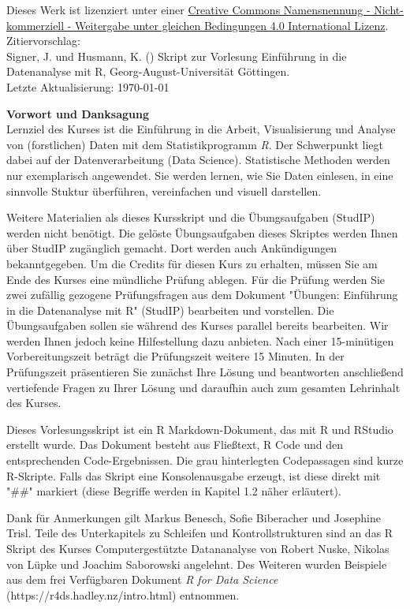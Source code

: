 \begin{titlepage}
\begin{center}
\end{center}
\newpage
\vspace*{\fill}
Dieses Werk ist lizenziert unter einer \href{https://creativecommons.org/licenses/by-nc-sa/4.0/}{Creative Commons Namensnennung - Nicht-kommerziell - Weitergabe unter gleichen Bedingungen 4.0 International Lizenz}. \\[1cm]
Zitiervorschlag: \\
Signer, J. und Husmann, K. (\the\year{}) Skript zur Vorlesung Einführung in die Datenanalyse mit R, Georg-August-Universität Göttingen.
~\\[1cm]
Letzte Aktualisierung: \today

\newpage

{\bf Vorwort und Danksagung} \\[0.5cm]

Lernziel des Kurses ist die Einführung in die Arbeit, Visualisierung und Analyse von (forstlichen) Daten mit dem Statistikprogramm \textit{R}. Der Schwerpunkt liegt dabei auf der Datenverarbeitung (Data Science). Statistische Methoden werden nur exemplarisch angewendet. Sie werden lernen, wie Sie Daten einlesen, in eine sinnvolle Stuktur überführen, vereinfachen und visuell darstellen.

Weitere Materialien als dieses Kursskript und die Übungsaufgaben (StudIP) werden nicht benötigt. Die gelöste Übungsaufgaben dieses Skriptes werden Ihnen über StudIP zugänglich gemacht. Dort werden auch Ankündigungen bekanntgegeben. Um die Credits für diesen Kurs zu erhalten, müssen Sie am Ende des Kurses eine mündliche Prüfung ablegen. Für die Prüfung werden Sie zwei zufällig gezogene Prüfungsfragen aus dem Dokument "Übungen: Einführung in die Datenanalyse mit R" (StudIP) bearbeiten und vorstellen. Die Übungsaufgaben sollen sie während des Kurses parallel bereits bearbeiten. Wir werden Ihnen jedoch keine Hilfestellung dazu anbieten. Nach einer 15-minütigen Vorbereitungszeit beträgt die Prüfungszeit weitere 15 Minuten. In der Prüfungszeit präsentieren Sie zunächst Ihre Lösung und beantworten anschließend vertiefende Fragen zu Ihrer Lösung und daraufhin auch zum gesamten Lehrinhalt des Kurses.

Dieses Vorlesungsskript ist ein R Markdown-Dokument, das mit R und RStudio erstellt wurde. Das Dokument besteht aus Fließtext, R Code und den entsprechenden Code-Ergebnissen. Die grau hinterlegten Codepassagen sind kurze R-Skripte. Falls das Skript eine Konsolenausgabe erzeugt, ist diese direkt mit "\#\#" markiert (diese Begriffe werden in Kapitel 1.2 näher erläutert).

Dank für Anmerkungen gilt Markus Benesch, Sofie Biberacher und Josephine Trisl. Teile des Unterkapitels zu Schleifen und Kontrollstrukturen sind an das R Skript des Kurses Computergestützte Datananalyse von Robert Nuske, Nikolas von Lüpke und Joachim Saborowski angelehnt. Des Weiteren wurden Beispiele aus dem frei Verfügbaren Dokument \textit{R for Data Science} (https://r4ds.hadley.nz/intro.html) entnommen.
\end{titlepage}

